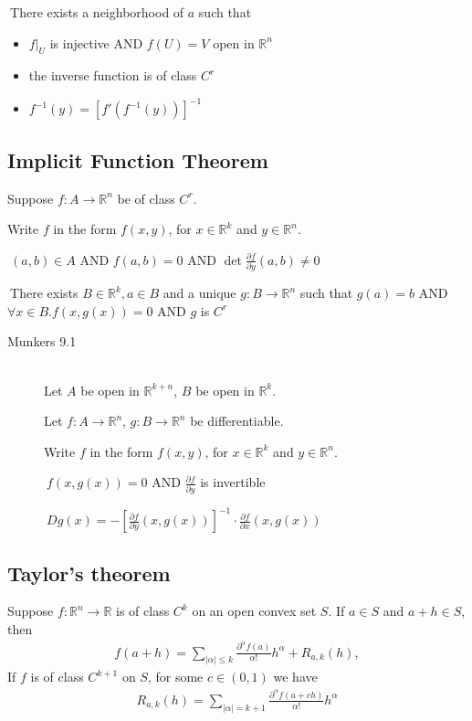 \thmTHEN
	$\ $There exists a neighborhood of $a$ such that
\begin{itemize}
	\item $f|_U$ is injective AND $f(U)=V$ open in $\mathbb{R}^n$
	\item the inverse function is of class $C^r$
	\item $f^{-1}(y)=[f'(f^{-1}(y))]^{-1}$
\end{itemize}


\subsection{Implicit Function Theorem}
\label{thm_ipft}
Suppose $f:A\to \mathbb{R}^n$ be of class $C^r$.

Write $f$ in the form $f(x, y)$, for $x\in \mathbb{R}^k$ and $y\in \mathbb{R}^n$.

\thmIF $\ (a, b)\in A$ AND $f(a, b)=0$ AND $\det \frac{\partial f}{\partial y}(a,b)\neq 0$

\thmTHEN $\ $There exists $B\in \mathbb{R}^k, a \in B$ and a unique $g:B\to \mathbb{R}^n$ such that
		$g(a)=b$ AND $\forall x\in B. f(x,g(x))=0$ AND $g$ is $C^r$

\begin{description}
	\item[Munkers 9.1] \hfill \\
		Let $A$ be open in $\mathbb{R}^{k+n}$, $B$ be open in $\mathbb{R}^k$.

		Let $f:A\to \mathbb{R}^n$, $g:B\to \mathbb{R}^n$ be differentiable.

		Write $f$ in the form $f(x, y)$, for $x\in \mathbb{R}^k$ and $y\in \mathbb{R}^n$.

		\thmIF $\ f(x, g(x))=0$ AND $\frac{\partial f}{\partial y}$ is invertible

		\thmTHEN $\ Dg(x)=-\left[\frac{\partial f}{\partial y}(x,g(x))\right]^{-1}\cdot \frac{\partial f}{\partial x}(x,g(x))$
\end{description}

\subsection{Taylor’s theorem}
\label{thm:taylor}
Suppose $f:\mathbb{R}^n \to \mathbb{R}$ is of class $C^k$ on an open convex set $S$. If $a \in S$ and $a+h \in S$, then
\begin{align*}
f(a+h) = \sum\limits_{|\alpha| \leq k} \frac{\partial^\alpha f(a)}{\alpha!}h^\alpha + R_{a,k}(h),
\end{align*}
If $f$ is of class $C^{k+1}$ on $S$, for some $c \in (0, 1)$ we have
\begin{align*}
 R_{a,k}(h) = \sum\limits_{|\alpha| = k+1} \frac{\partial^\alpha f(a+ch)}{\alpha!}h^\alpha
\end{align*}